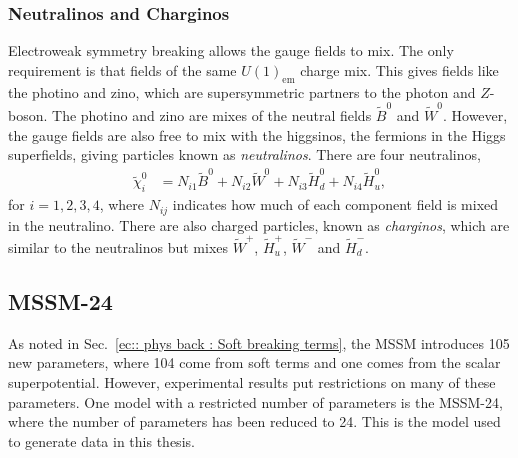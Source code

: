 \documentclass[twoside,english]{uiofysmaster}
\begin{document}
{\subsubsection{Neutralinos and Charginos}

Electroweak symmetry breaking allows the gauge fields to mix. The only requirement is that fields of the same $U(1)_{\mathrm{em}}$ charge mix. This gives  fields like the photino and zino, which are supersymmetric partners to the photon and $Z$-boson. The photino and zino are mixes of the neutral fields $\widetilde{B}^0$ and $\widetilde{W}^0$. However, the gauge fields are also free to mix with the higgsinos, the fermions in the Higgs superfields, giving particles known as \textit{neutralinos}. There are four neutralinos,
\begin{align}
\widetilde{\chi}_i^0 &= N_{i1} \widetilde{B}^0 + N_{i2} \widetilde{W}^0 + N_{i3} \widetilde{H}_d^0 + N_{i4} \widetilde{H}_u^0,
\end{align}
for $i=1,2,3,4$, where $N_{ij}$ indicates how much of each component field is mixed in the neutralino. There are also charged particles, known as \textit{charginos}, which are similar to the neutralinos but mixes $\widetilde{W}^+$, $\widetilde{H}_u^+$, $\widetilde{W}^-$ and $\widetilde{H}_d^-$.

\subsection{MSSM-24}\label{Sec:: phys back : MSSM-24}

As noted in Sec.~\ref{ec:: phys back : Soft breaking terms}, the MSSM introduces 105 new parameters, where 104 come from soft terms and one comes from the scalar superpotential. However, experimental results put restrictions on many of these parameters. One model with a restricted number of parameters is the MSSM-24, where the number of parameters has been reduced to 24. This is the model used to generate data in this thesis. 

}
\end{document}
